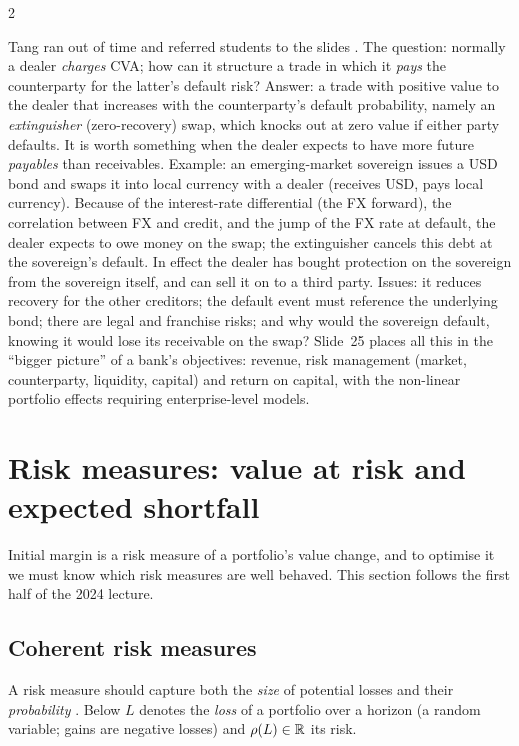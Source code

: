 \begin{paracol}{2}
\begin{coursenote}\label{ch08:rem-extinguisher}
Tang ran out of time and referred students to the slides . The question: normally a dealer
\emph{charges} CVA; how can it structure a trade in which it \emph{pays} the counterparty for the latter's default
risk? Answer: a trade with positive value to the dealer that increases with the counterparty's default probability,
namely an \emph{extinguisher} (zero-recovery) swap, which knocks out at zero value if either party defaults. It is
worth something when the dealer expects to have more future \emph{payables} than receivables. Example: an
emerging-market sovereign issues a USD bond and swaps it into local currency with a dealer (receives USD, pays
local currency). Because of the interest-rate differential (the FX forward), the correlation between FX and
credit, and the jump of the FX rate at default, the dealer expects to owe money on the swap; the extinguisher
cancels this debt at the sovereign's default. In effect the dealer has bought protection on the sovereign from the
sovereign itself, and can sell it on to a third party. Issues: it reduces recovery for the other creditors; the
default event must reference the underlying bond; there are legal and franchise risks; and why would the sovereign
default, knowing it would lose its receivable on the swap? Slide~25 places all this in the ``bigger picture'' of a
bank's objectives: revenue, risk management (market, counterparty, liquidity, capital) and return on capital,
with the non-linear portfolio effects requiring enterprise-level models.
\end{coursenote}

\section{Risk measures: value at risk and expected shortfall}\label{ch08:sec-riskmeasures}
Initial margin is a risk measure of a portfolio's value change, and to optimise it we must know which risk
measures are well behaved. This section follows the first half of the 2024 lecture.

\subsection{Coherent risk measures}
A risk measure should capture both the \emph{size} of potential losses and their \emph{probability}
. Below $L$ denotes the \emph{loss} of a portfolio over a horizon (a random variable; gains are
negative losses) and $\rho(L)\in\mathbb{R}$ its risk.


\end{paracol}
